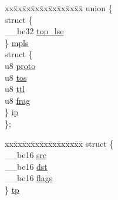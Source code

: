 \begin{DoxyCompactItemize}
\begin{tabbing}
\end{tabbing}\item 
\begin{tabbing}
xx\=xx\=xx\=xx\=xx\=xx\=xx\=xx\=xx\=\kill
union \{\\
\>struct \{\\
\>\>\_\_be32 \hyperlink{structsw__flow__key_a8deabdad62023ba089b9864374cb5c20}{top\_lse}\\
\>\} \hyperlink{structsw__flow__key_a005840d04ee5b462be3c8e21809dc9aa}{mpls}\\
\>struct \{\\
\>\>u8 \hyperlink{structsw__flow__key_a189368e5defc2dfbeed8f47b53f87094}{proto}\\
\>\>u8 \hyperlink{structsw__flow__key_af82daee0da7b81a0e1333965ec3f6180}{tos}\\
\>\>u8 \hyperlink{structsw__flow__key_aa53659c0aec0ef307046cb1d835ffa5a}{ttl}\\
\>\>u8 \hyperlink{structsw__flow__key_afe49934f508e0d054afce967d7ab25dd}{frag}\\
\>\} \hyperlink{structsw__flow__key_ae8d48c419eaff6a9fda97c7446bdec0e}{ip}\\
\}; \\

\end{tabbing}\item 
\begin{tabbing}
xx\=xx\=xx\=xx\=xx\=xx\=xx\=xx\=xx\=\kill
struct \{\\
\>\_\_be16 \hyperlink{structsw__flow__key_a0ff9e0ec68c48aea390c1880b42afc12}{src}\\
\>\_\_be16 \hyperlink{structsw__flow__key_a5d032dcf21ee5cf8a4d0261e3b05357f}{dst}\\
\>\_\_be16 \hyperlink{structsw__flow__key_a910f5e4408d113dbc9211190b44e0880}{flags}\\
\} \hyperlink{structsw__flow__key_a9c1944a39db1bf91141048df6d85ce8b}{tp}\\


\end{tabbing}
\end{DoxyCompactItemize}
